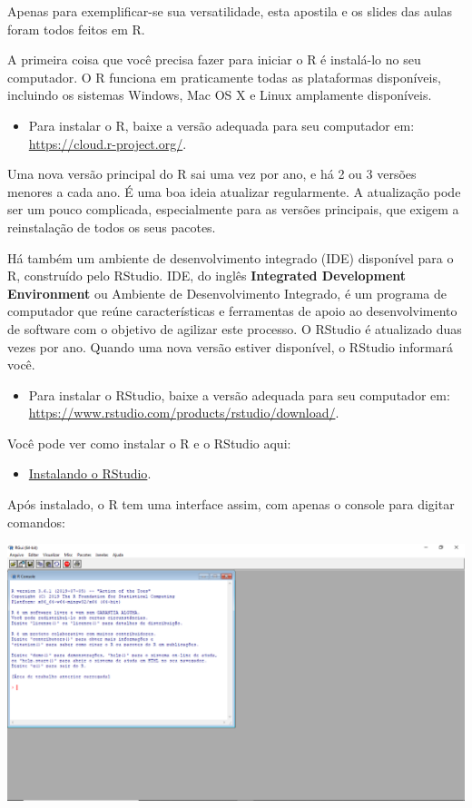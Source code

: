 \documentclass[a4paper]{book}
\providecommand{\tightlist}{%
  \setlength{\itemsep}{0pt}\setlength{\parskip}{0pt}}
\begin{document}
Apenas para exemplificar-se sua versatilidade, esta apostila e os slides das aulas foram todos feitos em R.

A primeira coisa que você precisa fazer para iniciar o R é instalá-lo no seu computador. O R funciona em praticamente todas as plataformas disponíveis, incluindo os sistemas Windows, Mac OS X e Linux amplamente disponíveis.

\begin{itemize}
\tightlist
\item
  Para instalar o R, baixe a versão adequada para seu computador em: \url{https://cloud.r-project.org/}.
\end{itemize}

Uma nova versão principal do R sai uma vez por ano, e há 2 ou 3 versões menores a cada ano. É uma boa ideia atualizar regularmente. A atualização pode ser um pouco complicada, especialmente para as versões principais, que exigem a reinstalação de todos os seus pacotes.

Há também um ambiente de desenvolvimento integrado (IDE) disponível para o R, construído pelo RStudio. IDE, do inglês \textbf{Integrated Development Environment} ou Ambiente de Desenvolvimento Integrado, é um programa de computador que reúne características e ferramentas de apoio ao desenvolvimento de software com o objetivo de agilizar este processo. O RStudio é atualizado duas vezes por ano. Quando uma nova versão estiver disponível, o RStudio informará você.

\begin{itemize}
\tightlist
\item
  Para instalar o RStudio, baixe a versão adequada para seu computador em: \url{https://www.rstudio.com/products/rstudio/download/}.
\end{itemize}

Você pode ver como instalar o R e o RStudio aqui:

\begin{itemize}
\tightlist
\item
  \href{https://www.youtube.com/watch?v=orjLGFmx6l4}{Instalando o RStudio}.
\end{itemize}

Após instalado, o R tem uma interface assim, com apenas o console para digitar comandos:

\begin{center}\includegraphics[width=0.9\linewidth]{imagens/r-project} \end{center}
\end{document}
